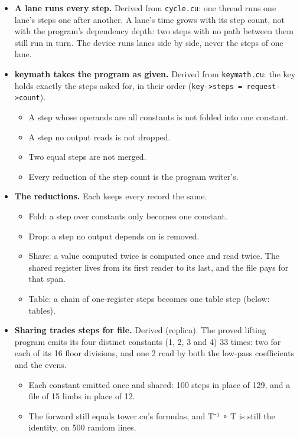 \begin{itemize}
\item \textbf{A lane runs every step.} Derived from \texttt{cycle.\allowbreak{}cu}: one thread runs one lane's steps one after another. A lane's time grows with its step count, not with the program's dependency depth: two steps with no path between them still run in turn. The device runs lanes side by side, never the steps of one lane.
\item \textbf{keymath takes the program as given.} Derived from \texttt{keymath.\allowbreak{}cu}: the key holds exactly the steps asked for, in their order (\texttt{key-\allowbreak{}>steps = request-\allowbreak{}>count}).

\begin{itemize}
\item A step whose operands are all constants is not folded into one constant.
\item A step no output reads is not dropped.
\item Two equal steps are not merged.
\item Every reduction of the step count is the program writer's.
\end{itemize}
\item \textbf{The reductions.} Each keeps every record the same.

\begin{itemize}
\item Fold: a step over constants only becomes one constant.
\item Drop: a step no output depends on is removed.
\item Share: a value computed twice is computed once and read twice. The shared register lives from its first reader to its last, and the file pays for that span.
\item Table: a chain of one-register steps becomes one table step (below: tables).
\end{itemize}
\item \textbf{Sharing trades steps for file.} Derived (replica). The proved lifting program emits its four distinct constants (1, 2, 3 and 4) 33 times: two for each of its 16 floor divisions, and one 2 read by both the low-pass coefficients and the evens.

\begin{itemize}
\item Each constant emitted once and shared: 100 steps in place of 129, and a file of 15 limbs in place of 12.
\item The forward still equals tower.cu's formulas, and T⁻¹ ∘ T is still the identity, on 500 random lines.
\end{itemize}
\end{itemize}

